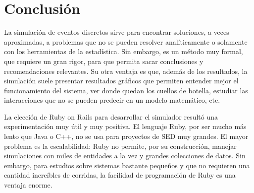 \section*{Conclusión}

La simulación de eventos discretos sirve para encontrar soluciones, a veces
aproximadas, a problemas que no se pueden resolver analíticamente o solamente
con los herramientas de la estadística. Sin embargo, es un método muy formal,
que requiere un gran rigor, para que permita sacar conclusiones y recomendaciones
relevantes. Su otra ventaja es que, además de los resultados, la simulación suele
presentar resultados gráficos que permiten entender mejor el funcionamiento del
sistema, ver donde quedan los cuellos de botella, estudiar las interacciones
que no se pueden predecir en un modelo matemático, etc.


La elección de Ruby on Rails para desarrollar el simulador resultó una 
experimentación muy útil y muy positiva. El lenguaje Ruby, por ser mucho más
lento que Java o C++, no se usa para proyectos de SED muy grandes. 
El mayor problema es la escalabilidad: Ruby no permite, por su construcción,
manejar simulaciones con miles de entidades a la vez y grandes colecciones de datos.
Sin embargo, para estudios sobre sistemas bastante pequeños y que no requieren 
una cantidad increíbles de corridas, la facilidad de programación de Ruby 
es una ventaja enorme. 


